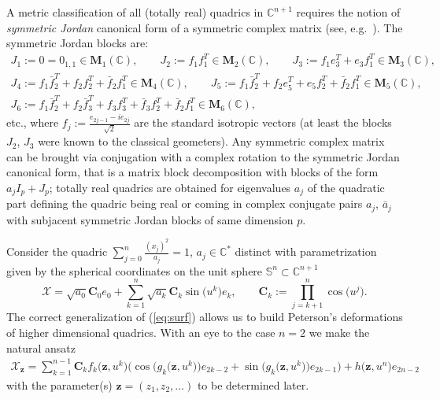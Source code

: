 \documentclass[11pt]{article}
\begin{document}
\begin{remark}
A metric classif\/ication of all (totally real) quadrics in
$\mathbb{C}^{n+1}$ requires the notion of {\it symmetric Jordan}
canonical form of a symmetric complex matrix (see, e.g.~\cite{H}). The symmetric Jordan blocks are:
\begin{gather*}
J_1:=0=0_{1,1}\in\mathbf{M}_1(\mathbb{C}),\qquad
J_2:=f_1f_1^T\in\mathbf{M}_2(\mathbb{C}),\qquad
J_3:=f_1e_3^T+e_3f_1^T\in\mathbf{M}_3(\mathbb{C}),
\\
J_4:=f_1\bar f_2^T+f_2f_2^T+\bar
f_2f_1^T\in\mathbf{M}_4(\mathbb{C}),\qquad J_5:= f_1\bar
f_2^T+f_2e_5^T+e_5f_2^T+\bar
f_2f_1^T\in\mathbf{M}_5(\mathbb{C}),
\\
J_6:= f_1\bar f_2^T+f_2\bar f_3^T+f_3f_3^T+\bar f_3f_2^T+\bar
f_2f_1^T\in\mathbf{M}_6(\mathbb{C}),
\end{gather*}
etc., where $f_j:=\frac{e_{2j-1}-ie_{2j}}{\sqrt{2}}$ are the
standard isotropic vectors (at least the blocks $J_2$, $J_3$ were
known to the classical geometers). Any symmetric complex matrix
can be brought via conjugation with a complex rotation to the
symmetric Jordan canonical form, that is a matrix block
decomposition with blocks of the form $a_jI_p+J_p$; totally real
quadrics are obtained for eigenvalues $a_j$ of the quadratic part
def\/ining the quadric being real or coming in complex conjugate
pairs $a_j$, $\bar a_j$ with subjacent symmetric Jordan blocks of
same dimension $p$.
\end{remark}

Consider the quadric $\sum\limits_{j=0}^n\frac{(x_j)^2}{a_j}=1$, $
a_j\in\mathbb{C}^*$ distinct with parametrization given by the
spherical coordinates on the unit sphere
$\mathbb{S}^n\subset\mathbb{C}^{n+1}$
\[
\mathcal{X}=\sqrt{a_0}\mathbf{C}_0e_0+
\sum_{k=1}^n\sqrt{a_k}\mathbf{C}_k\sin\big(u^k\big)e_k,\qquad
\mathbf{C}_k:=\prod_{j=k+1}^n\cos\big(u^j\big).
\]
The correct generalization of (\ref{eq:surf}) allows us to build
Peterson's deformations of higher dimensional quadrics. With an
eye to the case $n=2$ we make the natural ansatz
\begin{gather}
\mathcal{X}_{\mathbf{z}}=\sum_{k=1}^{n-1}\mathbf{C}_kf_k\big(\mathbf{z},u^k\big)
\big(\cos\big(g_k\big(\mathbf{z},u^k\big)\big)e_{2k-2}
+\sin\big(g_k\big(\mathbf{z},u^k\big)\big)e_{2k-1}\big)+h\big(\mathbf{z},u^n\big)e_{2n-2}\label{eq:surf3}
\end{gather}
with the parameter(s) $\mathbf{z}=(z_1,z_2,\dots )$ to be determined
later.
\end{document}
